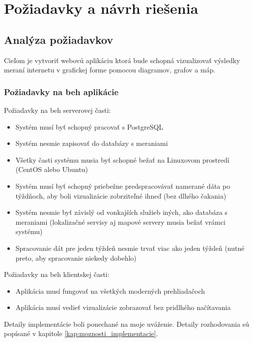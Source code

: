 \chapter{Požiadavky a návrh riešenia}

\label{kap:navrh_riesenia}

\section{Analýza požiadavkov}

Cieľom je vytvoriť webovú aplikáciu ktorá bude schopná vizualizovať výsledky meraní internetu v grafickej forme pomocou diagramov, 
grafov a máp. 

\subsection{Požiadavky na beh aplikácie}

Požiadavky na beh serverovej časti:
\begin{itemize}
    \item Systém musí byť schopný pracovať s PostgreSQL
    \item Systém nesmie zapisovať do databázy s meraniami
    \item Všetky časti systému musia byť schopné bežať na Linuxovom prostredí (CentOS alebo Ubuntu)
    \item Systém musí byť schopný priebežne predspracovávať namerané dáta po týždňoch, 
    aby boli vizualizácie zobrziteľné ihneď (bez dlhého čakania)
    \item Systém nesmie byť závislý od vonkajších služieb iných, ako databáza s meraniami 
    (lokalizačné servisy aj mapové servery musia bežať vrámci systému)
    \item Spracovanie dát pre jeden týždeň nesmie trvať viac ako jeden týždeň (nutné preto, aby spracovanie niekedy dobehlo)
\end{itemize}
Požiadavky na beh klientskej časti:
\begin{itemize}
    \item Aplikácia musí fungovať na všetkých moderných prehliadačoch
    \item Aplikácia musí vedieť vizualizácie zobrazovať bez pridlhého načítavania
\end{itemize}

Detaily implementácie boli ponechané na moje uváženie. Detaily rozhodovania sú popísané v kapitole \ref{kap:moznosti_implementacie}.


